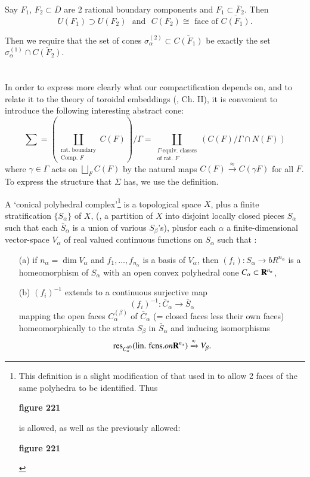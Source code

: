 \begin{description}
Say $F_1$, $F_2 \subset \overline{D}$ are 2 rational boundary components and $F_1 \subset \bar{F}_2$. Then
$$
U(F_1) \supset U (F_2) \text{~ and ~} C (F_2) \cong \text{ face of } \overline{C(F_1)}.
$$

Then we require that the set of cones $\sigma_\alpha^{(2)} \subset \overline{C(F_1)}$ be exactly the set $\sigma^{(1)}_\alpha \cap \overline{C(F_2)}$.
\end{description}

\section{}\label{art8-sec4}
In order to express more clearly what our compactification depends on, and to relate it to the theory of toroidal embeddings  (\cite{art8-key8}, Ch. II), it is convenient to introduce the following interesting abstract cone:
$$
\sum =  \left(\coprod\limits_{\substack{\text{rat. boundary}\\\text{Comp. $F$}}} C (F) \right) / \Gamma = \coprod\limits_{\substack{\text{$\Gamma$-equiv. classes}\\\text{of rat. $F$}}} (C (F) / \Gamma \cap N (F) )
$$
where $\gamma \in \Gamma$ acts on $\bigsqcup\limits_F C (F)$ by the natural maps $C(F) \xrightarrow{\approx} C(\gamma F)$ for all $F$. To express the structure that $\Sigma$ has, we use the definition.

\begin{defi*}
A `conical polyhedral complex'\footnote{This definition is a slight modification of that used in \cite{art8-key8} to allow 2 faces of the same polyhedra to be identified. Thus
\begin{center}
{\bf figure 221}
\end{center}
is allowed, as well as the previously allowed:
\begin{center}
{\bf figure 221}
\end{center}}
is a topological space $X$, plus a finite stratification $\{S_\alpha\}$ of $X$, (\ie, a partition of $X$ into disjoint locally closed pieces $S_\alpha$ such that each $\bar{S}_\alpha$ is a union of various $S_\beta$'s), plus\pageoriginale for each $\alpha$ a finite-dimensional vector-space $V_\alpha$ of real valued continuous functions on $S_\alpha$ such that :
\begin{itemize}
\item[(a)] if $n_\alpha = \dim V_\alpha$ and $f_1, \ldots, f_{n_\alpha}$ is a basis of $V_\alpha$, then $(f_i) : S_\alpha \to bR^{n_\alpha}$ is a homeomorphism of $S_\alpha$ with an open convex polyhedral cone $C_\alpha \subset \mathbf{R}^{n_\alpha}$,

\item[(b)] $(f_i)^{-1}$ extends to a continuous surjective map
$$
(f_i)^{-1} : \bar{C}_\alpha  \to \bar{S}_\alpha
$$
mapping the open faces $C^{(\beta)}_\alpha$ of $\bar{C}_\alpha$ (= closed faces less their own faces) homeomorphically to the strata $S_\beta$ in $\bar{S}_\alpha$ and inducing isomorphisms
$$
\operatorname{res}\limits_{C^{(\beta)}_\alpha} (\text{lin. fcns.} on \mathbf{R}^{n_\alpha}) \xrightarrow{\approx} V_\beta.
$$
\end{itemize}
\end{defi*}

